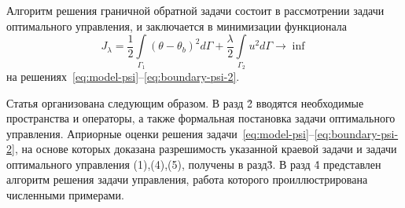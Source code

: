 Алгоритм решения граничной обратной задачи состоит в рассмотрении задачи оптимального управления,
и заключается в минимизации функционала
\begin{equation}
    \label{eq:quality}
    J_\lambda = \frac{1}{2}\int\limits_{\Gamma_1} (\theta - \theta_b)^2 d\Gamma
    + \frac{\lambda}{2} \int\limits_{\Gamma_2} u^2 d\Gamma \rightarrow \inf
\end{equation}
на решениях~\eqref{eq:model-psi}--\eqref{eq:boundary-psi-2}.


Статья организована следующим образом.
В разд \. 2 вводятся необходимые пространства и операторы,
а также формальная постановка задачи оптимального управления.
Априорные оценки решения задачи~\eqref{eq:model-psi}--\eqref{eq:boundary-psi-2}, на основе которых доказана разрешимость
указанной краевой задачи и задачи оптимального управления (1),(4),(5), получены в разд\. 3.
В разд \. 4 представлен алгоритм решения задачи управления, работа которого
проиллюстрирована численными примерами.

